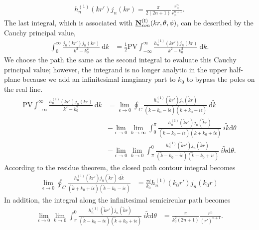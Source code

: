\documentclass[journal=jacsat,manuscript=article,layout=traditional]{achemso}
\newcommand*\diff{\mathrm{d}}
\newcommand{\norF}[1]{\underline{\vb{#1}}}
\newcommand{\RomanI}{\scriptsize\textrm{I}}
\begin{document}
\begin{appendix}
\begin{align}
    h_n^{(1)}(kr')j_n(kr)
    =\frac{\pi}{2(2n+1)}
    \frac{r_<^n}{r_>^{n+1}}.
\end{align}
The last integral, which is associated with $\norF{N}_{nm}^{(\RomanI)}(kr,\theta,\phi)$, can be described by the Cauchy principal value,
\begin{align}
    \label{Eq:targetN}
    \int_0^\infty
    \frac{j_n(kr')j_n(kr)}{k^2-k_0^2}~ \diff{k}
    &=
    \frac{1}{2}\mathrm{PV}
    \int_{-\infty}^\infty 
    \frac{h_n^{(1)}(kr')j_n(kr)}{k^2-k_0^2}~\diff{k}.
\end{align}
We choose the path the same as the second integral to evaluate this Cauchy principal value; however, the integrand is no longer analytic in the upper half-plane because we add an infinitesimal imaginary part to $k_0$ to bypass the poles on the real line.
\begin{align}
    \nonumber
    \mathrm{PV}
    \int_{-\infty}^\infty
    \frac{h_n^{(1)}(kr')j_n(kr)}{k^2-k_0^2}~\diff{k}
    &=
    \lim_{\epsilon\rightarrow0}\oint_C 
    \frac{h_n^{(1)}(\tilde{k}r')j_n(\tilde{k}r)}
    {(\tilde{k}-k_0-i\epsilon)(\tilde{k}+k_0+i\epsilon)}
    ~\diff{\tilde{k}}\\
    \nonumber
    &-
    \lim_{\epsilon\rightarrow0}
    \lim_{k\rightarrow\infty}\int_0^\pi
    \frac{h_n^{(1)}(\tilde{k}r')j_n(\tilde{k}r)}
    {(\tilde{k}-k_0-i\epsilon)(\tilde{k}+k_0+i\epsilon)}~i\tilde{k}\diff{\theta}\\
    &-
    \lim_{\epsilon\rightarrow0}
    \lim_{k\rightarrow0}\int_\pi^0
    \frac{h_n^{(1)}(\tilde{k}r')j_n(\tilde{k}r)}
    {(\tilde{k}-k_0-i\epsilon)(\tilde{k}+k_0+i\epsilon)}
    ~i\tilde{k}\diff{\theta}.
    \label{Eq:AppendContourIntN}
\end{align}
According to the residue theorem, the closed path contour integral becomes
\begin{align}
    \lim_{\epsilon\rightarrow0}\oint_C \frac{
    h_n^{(1)}(\tilde{k}r')j_n(\tilde{k}r)~\diff{\tilde{k}}}
    {(\tilde{k}+k_0+i\epsilon)(\tilde{k}-k_0-i\epsilon)}
    &=\frac{\pi i}{k_0}
    h_n^{(1)}(k_0r')j_n(k_0r)
\end{align}
In addition, the integral along the infinitesimal semicircular path becomes
\begin{align}
    \lim_{\epsilon\rightarrow0}
    \lim_{k\rightarrow0}\int_\pi^0
    \frac{h_n^{(1)}(\tilde{k}r')j_n(\tilde{k}r)}
    {(\tilde{k}-k_0-i\epsilon)(\tilde{k}+k_0+i\epsilon)}
    ~i\tilde{k}\diff{\theta}
    &=
    \frac{\pi}{k_0^2(2n+1)}
    \frac{r^n}{(r')^{n+1}}.
\end{align}

\end{appendix}
\end{document}
